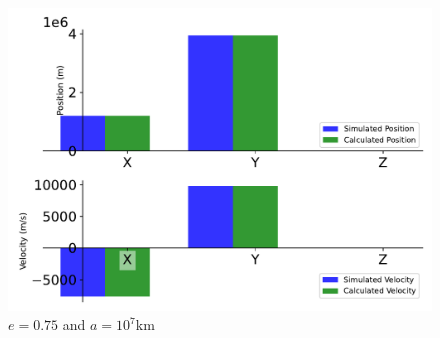 \begin{figure}[htbp]\centerline{\includegraphics[height=0.7\textwidth, keepaspectratio]{AutoTeX/EquEllip_e_2}}\caption{$e = 0.75$ and $a = 10^7$km}\label{fig:EquEllip_e_2}\end{figure}